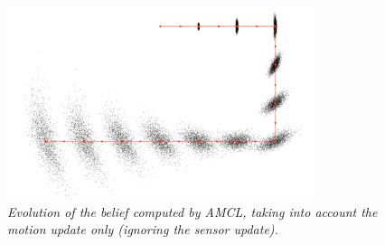 \begin{description}
\begin{figure}
	\centering
	\includegraphics[width=0.8\textwidth]{Images/localization/motionModel.png}
	\caption{\textit{Evolution of the belief computed by \ac{AMCL}, taking into account the motion update only (ignoring the sensor update).}}
	\label{fig:motionModelExample}
\end{figure}



\end{description}
